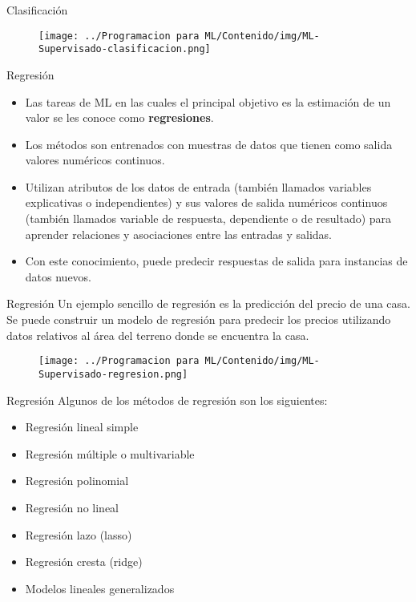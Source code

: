 \documentclass[11pt,aspectratio=169]{beamer}
\begin{document}
\begin{frame}{Clasificación}
\begin{figure}[H]
	\centering
	\texttt{[image: ../Programacion para ML/Contenido/img/ML-Supervisado-clasificacion.png]}
\end{figure}
\end{frame}

\begin{frame}{Regresión}
\begin{itemize}
	\item Las tareas de ML en las cuales el principal objetivo es la estimación de un valor se les conoce como \textbf{regresiones}. \pause
	\item Los métodos son entrenados con muestras de datos que tienen como salida valores numéricos continuos.\pause
	\item Utilizan atributos de los datos de entrada (también llamados variables explicativas o independientes) y sus valores de 
		salida numéricos continuos (también llamados variable de respuesta, dependiente o de resultado) para aprender relaciones 
		y asociaciones entre las entradas y salidas. \pause 
	\item Con este conocimiento, puede predecir respuestas de salida para instancias de datos nuevos.
\end{itemize}
\end{frame}

\begin{frame}{Regresión}
Un ejemplo sencillo de regresión es la predicción del precio de una casa. Se puede construir un modelo de regresión para predecir los precios utilizando 
datos relativos al área del terreno donde se encuentra la casa. 
\begin{figure}[H]
	\centering
	\texttt{[image: ../Programacion para ML/Contenido/img/ML-Supervisado-regresion.png]}
\end{figure}
\end{frame}

\begin{frame}{Regresión}
Algunos de los métodos de regresión son los siguientes:\pause
\begin{itemize}
	\item Regresión lineal simple\pause
	\item Regresión múltiple o multivariable\pause
	\item Regresión polinomial\pause
	\item Regresión no lineal\pause
	\item Regresión lazo (lasso)\pause
	\item Regresión cresta (ridge)\pause
	\item Modelos lineales generalizados			
\end{itemize}
\end{frame}
\end{document}
